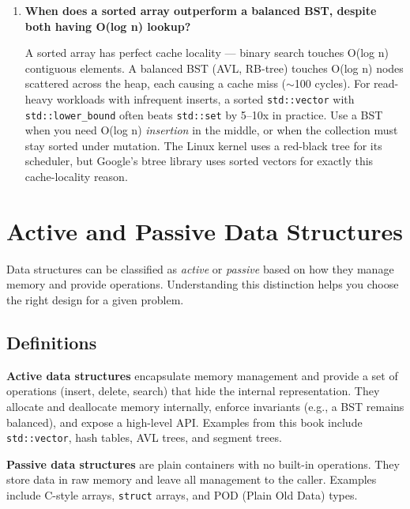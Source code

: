 \begin{enumerate}
\item \textbf{When does a sorted array outperform a balanced BST, despite both having O(log n) lookup?}

A sorted array has perfect cache locality --- binary search touches O(log n) contiguous elements. A balanced BST (AVL, RB-tree) touches O(log n) nodes scattered across the heap, each causing a cache miss ($\sim$100 cycles). For read-heavy workloads with infrequent inserts, a sorted \texttt{std::vector} with \texttt{std::lower\_bound} often beats \texttt{std::set} by 5--10x in practice. Use a BST when you need O(log n) \emph{insertion} in the middle, or when the collection must stay sorted under mutation. The Linux kernel uses a red-black tree for its scheduler, but Google's btree library uses sorted vectors for exactly this cache-locality reason.
\end{enumerate}

\section{Active and Passive Data Structures}

\label{sec:active-passive}

Data structures can be classified as \emph{active} or \emph{passive} based on how they manage memory and provide operations. Understanding this distinction helps you choose the right design for a given problem.

\subsection{Definitions}

\textbf{Active data structures} encapsulate memory management and provide a set of operations (insert, delete, search) that hide the internal representation. They allocate and deallocate memory internally, enforce invariants (e.g., a BST remains balanced), and expose a high-level API. Examples from this book include \texttt{std::vector}, hash tables, AVL trees, and segment trees.

\textbf{Passive data structures} are plain containers with no built-in operations. They store data in raw memory and leave all management to the caller. Examples include C-style arrays, \texttt{struct} arrays, and POD (Plain Old Data) types.

